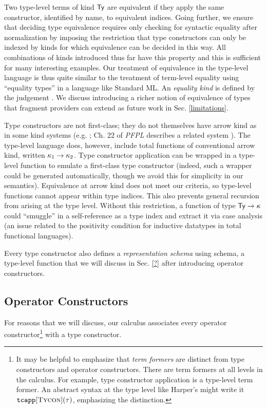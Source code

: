 \documentclass[9pt,preprint]{sigplanconf}
\begin{document}
Two type-level terms of kind $\textsf{Ty}$ are equivalent if they apply the same constructor, identified by name, to equivalent indices. Going further, we ensure that deciding type equivalence requires only checking for syntactic equality after normalization by imposing the restriction that type constructors can only be indexed by kinds for which equivalence can be decided in this way. All combinations of kinds introduced thus far  have this property and this is sufficient for many interesting examples. Our treatment of equivalence in the type-level language is thus quite similar to the treatment of term-level equality using ``equality types'' in a language like Standard ML. An \emph{equality kind} is defined by the judgement . We discuss introducing a richer notion of  equivalence of types that  fragment providers can extend as future work in Sec. \ref{limitations}.%

Type constructors are not first-class; they do not themselves have arrow kind as in some kind systems (e.g.  \cite{Watkins08}; Ch. 22 of \emph{PFPL} describes a related system \cite{pfpl}). The type-level language does, however, include total functions of conventional arrow kind, written $\kappa_1\rightarrow{\kappa_2}$. Type constructor application can be wrapped in a type-level function to emulate a first-class type constructor (indeed, such a wrapper could be generated automatically, though we avoid this for simplicity in our semantics). Equivalence at arrow kind does not meet our criteria, so type-level functions cannot appear within type indices. This also prevents general recursion from arising at the type level. Without this restriction, a function of type $\textsf{Ty}\rightarrow{\kappa}$ could ``smuggle'' in a self-reference as a type index and extract it via case analysis (an issue related to the positivity condition for inductive datatypes in total functional languages).

Every type constructor also defines a \emph{representation schema} using \textsf{schema}, a type-level function that we will discuss in Sec. \ref{?} after introducing operator constructors. 

\subsection{Operator Constructors}
For reasons that we will discuss, our calculus associates every operator  constructor\footnote{It may be helpful to emphasize that \emph{term formers} are distinct from type constructors and operator constructors. There are term formers at all levels in the calculus. For example, type constructor application is a type-level term former. An abstract syntax at the type level like Harper's \cite{pfpl} might write it $\texttt{tcapp}[\textsc{Tycon}](\tau)$, emphasizing the distinction.} with a type constructor.
\end{document}
